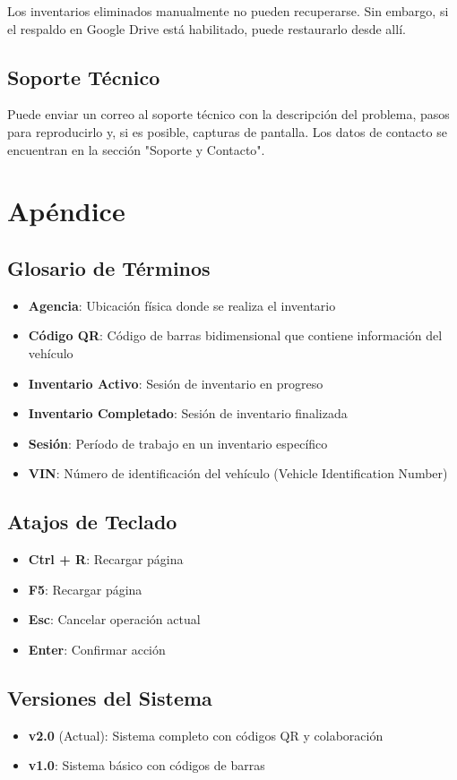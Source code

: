 \documentclass[11pt,a4paper]{article}
\begin{document}
\begin{warningbox}
Los inventarios eliminados manualmente no pueden recuperarse. Sin embargo, si el respaldo en Google Drive está habilitado, puede restaurarlo desde allí.
\end{warningbox}

\subsection{Soporte Técnico}

\begin{infobox}
Puede enviar un correo al soporte técnico con la descripción del problema, pasos para reproducirlo y, si es posible, capturas de pantalla. Los datos de contacto se encuentran en la sección "Soporte y Contacto".
\end{infobox}


\section{Apéndice}

\subsection{Glosario de Términos}

\begin{itemize}
    \item \textbf{Agencia}: Ubicación física donde se realiza el inventario
    \item \textbf{Código QR}: Código de barras bidimensional que contiene información del vehículo
    \item \textbf{Inventario Activo}: Sesión de inventario en progreso
    \item \textbf{Inventario Completado}: Sesión de inventario finalizada
    \item \textbf{Sesión}: Período de trabajo en un inventario específico
    \item \textbf{VIN}: Número de identificación del vehículo (Vehicle Identification Number)
\end{itemize}

\subsection{Atajos de Teclado}

\begin{itemize}
    \item \textbf{Ctrl + R}: Recargar página
    \item \textbf{F5}: Recargar página
    \item \textbf{Esc}: Cancelar operación actual
    \item \textbf{Enter}: Confirmar acción
\end{itemize}

\subsection{Versiones del Sistema}

\begin{itemize}
    \item \textbf{v2.0} (Actual): Sistema completo con códigos QR y colaboración
    \item \textbf{v1.0}: Sistema básico con códigos de barras
\end{itemize}
\end{document}
